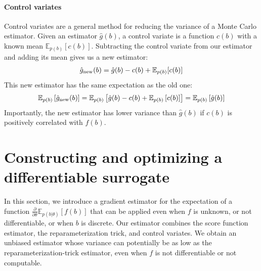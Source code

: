 \documentclass{article}
\newcommand{\controlf}{c}  %
\newcommand{\E}{\mathbb{E}}
\newcommand{\PT}{\frac{\partial}{\partial \theta}}
\begin{document}
\paragraph{Control variates}
Control variates are a general method for reducing the variance of a Monte Carlo estimator.
Given an estimator $\hat g(b)$, a control variate is a function $\controlf(b)$ with a known mean $\mathbb{E}_{p(b)} [ \controlf(b) ]$.
Subtracting the control variate from our estimator and adding its mean gives us a new estimator:
%
\begin{align}
\hat g_\textnormal{new}(b) = \hat g(b) - \controlf(b) + \mathbb{E}_{p(b)}[\controlf(b)]
\end{align}
%
This new estimator has the same expectation as the old one:
%
\begin{align}
\mathbb{E}_{p(b)}\left[\hat g_\textnormal{new}(b) \right] 
= \mathbb{E}_{p(b)}\left[\hat g(b) - \controlf(b) + \mathbb{E}_{p(b)} \left[ \controlf(b) \right] \right]
= \mathbb{E}_{p(b)}\left[ \hat g(b) \right]
\end{align}
%
Importantly, the new estimator has lower variance than $\hat g(b)$ if $\controlf(b)$ is positively correlated with $f(b)$.

\section{Constructing and optimizing a differentiable surrogate}
\label{lax section}
In this section, we introduce a gradient estimator for the expectation of a function $\PT \E_{p(b|\theta)}[f(b)]$ that can be applied even when $f$ is unknown, or not differentiable, or when $b$ is discrete.
Our estimator combines the score function estimator, the reparameterization trick, and control variates.
We obtain an unbiased estimator whose variance can potentially be as low as the reparameterization-trick estimator, even when $f$ is not differentiable or not computable.
\end{document}

